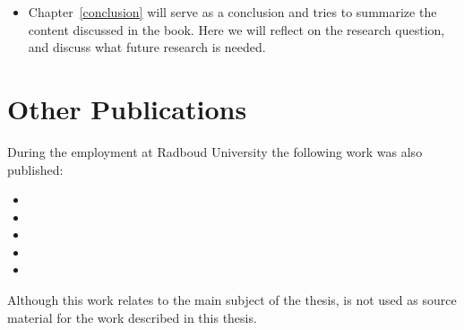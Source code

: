 \begin{itemize}
{
\scriptsize
	\begin{itemize}
		\item {}
	\end{itemize}
}

\item Chapter~\ref{conclusion} will serve as a conclusion and tries to summarize the content discussed in the book. Here we will reflect on the research question, and discuss what future research is needed.
\end{itemize}

\section{Other Publications}
During the employment at Radboud University the following work was also published: 

{\scriptsize
\begin{itemize}	
	\item {}
	\item {}	
	\item {}
	\item {}
	\item {}
\end{itemize}
}

Although this work relates to the main subject of the thesis, is not used as source material for the work described in this thesis. 